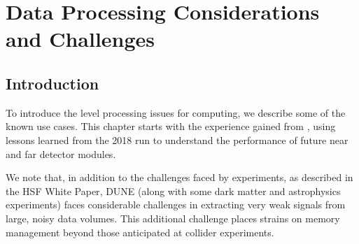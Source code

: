 \documentclass[../main-v1.tex]{subfiles}
\begin{document}
\chapter{Data Processing Considerations and Challenges}
\label{ch:use}
\newcommand{\ignore}[1]{{}}


\section{Introduction }

To introduce the  level processing issues for  computing, we describe some of the known use cases.  %
This chapter starts with  the experience gained from  ,  using lessons learned from the 2018 run to understand the performance of future near and far detector modules. 

We note that, in addition to the challenges faced by  experiments, as described in the HSF White Paper\cite{HEPSoftwareFoundation:2017ggl}, DUNE (along with some dark matter and astrophysics experiments) faces considerable challenges in extracting very weak signals from large, noisy data volumes.  This additional challenge places strains on memory management beyond those anticipated at collider experiments. 



\end{document}
